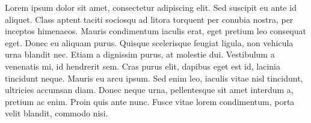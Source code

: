 \documentclass[10pt, titlepage, a4paper]{article}
\begin{document}
\begin{titlepage}

\end{titlepage}

\thispagestyle{fancy}
\fancyfoot[L]{}
\renewcommand{\headrulewidth}{0.4pt}
\renewcommand{\footrulewidth}{0.4pt}


\def\abstract{
   \vfil
\begin{center}%
{\bfseries\abstractname\vspace{-.5em}}
\end{center}
\itshape
}

\def\endabstract{\par
}
\begin{abstract}
Lorem ipsum dolor sit amet, consectetur adipiscing elit. Sed suscipit eu ante id aliquet. Class aptent taciti sociosqu ad litora torquent per conubia nostra, per inceptos himenaeos. Mauris condimentum iaculis erat, eget pretium leo consequat eget. Donec eu aliquam purus. Quisque scelerisque feugiat ligula, non vehicula urna blandit nec. Etiam a dignissim purus, at molestie dui. Vestibulum a venenatis mi, id hendrerit sem. Cras purus elit, dapibus eget est id, lacinia tincidunt neque. Mauris eu arcu ipsum. Sed enim leo, iaculis vitae nisl tincidunt, ultricies accumsan diam. Donec neque urna, pellentesque sit amet interdum a, pretium ac enim. Proin quis ante nunc. Fusce vitae lorem condimentum, porta velit blandit, commodo nisi.
\end{abstract}
\newpage
\hypersetup{linkcolor=black}
\tableofcontents
\hypersetup{linkcolor=red}
\end{document}
